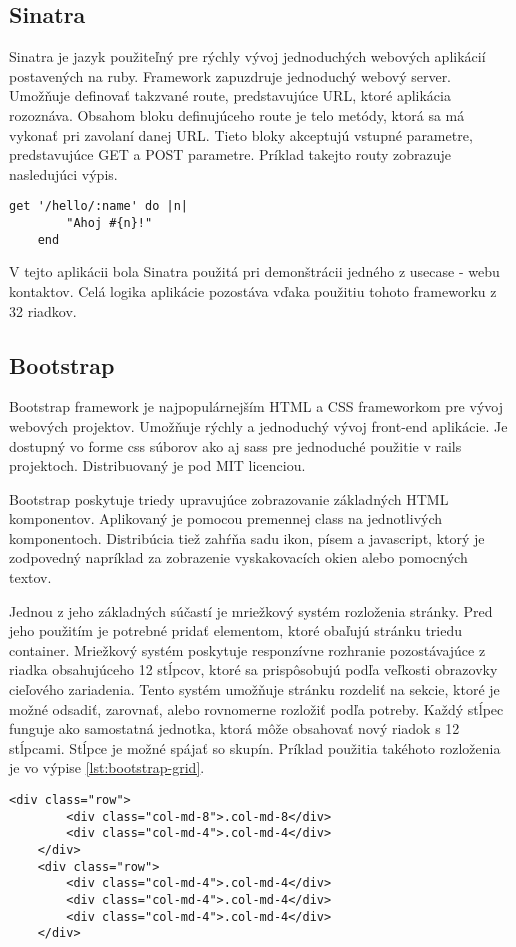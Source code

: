 	\subsection{Sinatra}
	Sinatra je jazyk použiteľný pre rýchly vývoj jednoduchých webových aplikácií postavených na ruby. Framework zapuzdruje jednoduchý webový server. Umožňuje definovať takzvané route, predstavujúce URL, ktoré aplikácia rozoznáva. Obsahom bloku definujúceho route je telo metódy, ktorá sa má vykonať pri zavolaní danej URL. Tieto bloky akceptujú vstupné parametre, predstavujúce GET a POST parametre. Príklad takejto routy zobrazuje nasledujúci výpis.
	\begin{lstlisting}[label=lst:sinatra-sampel,caption=Príklad definovania GET route vo frameworku Sinatra]
	get '/hello/:name' do |n|
		"Ahoj #{n}!"
	end
	\end{lstlisting}
	V tejto aplikácii bola Sinatra použitá pri demonštrácii jedného z usecase - webu kontaktov. Celá logika aplikácie pozostáva vďaka použitiu tohoto frameworku z 32 riadkov.

	\subsection{Bootstrap}
	Bootstrap framework je najpopulárnejším HTML a CSS frameworkom pre vývoj webových projektov. Umožňuje rýchly a jednoduchý vývoj front-end aplikácie. Je dostupný vo forme css súborov ako aj sass pre jednoduché použitie v rails projektoch. Distribuovaný je pod MIT licenciou.
	
	Bootstrap poskytuje triedy upravujúce zobrazovanie základných HTML komponentov. Aplikovaný je pomocou premennej class na jednotlivých komponentoch. Distribúcia tiež zahŕňa sadu ikon, písem a javascript, ktorý je zodpovedný napríklad za zobrazenie vyskakovacích okien alebo pomocných textov. 
	
	Jednou z jeho základných súčastí je mriežkový systém rozloženia stránky. Pred jeho použitím je potrebné pridať elementom, ktoré obaľujú stránku triedu container.	Mriežkový systém poskytuje responzívne rozhranie pozostávajúce z riadka obsahujúceho 12 stĺpcov, ktoré sa prispôsobujú podľa veľkosti obrazovky cieľového zariadenia. Tento systém umožňuje stránku rozdeliť na sekcie, ktoré je možné odsadiť, zarovnať, alebo rovnomerne rozložiť podľa potreby. Každý stĺpec funguje ako samostatná jednotka, ktorá môže obsahovať nový riadok s 12 stĺpcami. Stĺpce je možné spájať so skupín. Príklad použitia takéhoto rozloženia je vo výpise \ref{lst:bootstrap-grid}.
	\begin{lstlisting}[label=lst:bootstrap-grid,caption=Príklad použitia Bootstrap grid systému]
	<div class="row">
		<div class="col-md-8">.col-md-8</div>
		<div class="col-md-4">.col-md-4</div>
	</div>
	<div class="row">
		<div class="col-md-4">.col-md-4</div>
		<div class="col-md-4">.col-md-4</div>
		<div class="col-md-4">.col-md-4</div>
	</div>
	\end{lstlisting}
	
